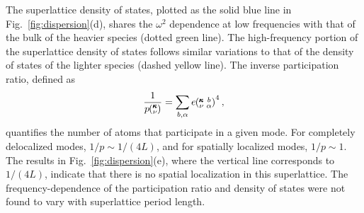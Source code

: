 \documentclass[aps,prb,preprint,preprintnumbers,amsmath,amssymb,floatfix,superscriptaddress]{revtex4}
\newcommand{\kvba}{\mspace{-4.0mu}\left(\mspace{-8.0mu}
\begin{smallmatrix} &\pmb{\kappa} &b \\ &\nu &\alpha\end{smallmatrix}
\mspace{-3.0mu}\right)}
\newcommand{\kv}{\mspace{-4.0mu}\left(\mspace{-8.0mu}
\begin{smallmatrix}&\pmb{\kappa} \\&\nu\end{smallmatrix}
\mspace{-3.0mu}\right)}
\begin{document}
The superlattice density of states, plotted as the solid blue line in Fig.~\ref{fig:dispersion}(d), shares the $\omega^2$ dependence at low frequencies with that of the bulk of the heavier species (dotted green line). The high-frequency portion of the superlattice density of states follows similar variations to that of the density of states of the lighter species (dashed yellow line). The inverse participation ratio, defined as\cite{PhysRevB.70.235214}
\begin{equation}\label{EQ:P_ratio}
\begin{split}
\frac{1}{p\kv}=\sum_{b,\alpha}e\kvba^4,
\end{split}
\end{equation}
quantifies the number of atoms that participate in a given mode. For completely delocalized modes, $1/p\sim 1/(4L)$, and for spatially localized modes, $1/p\sim 1$. The results in Fig.~\ref{fig:dispersion}(e), where the vertical line corresponds to $1/(4L)$, indicate that there is no spatial localization in this superlattice. The frequency-dependence of the participation ratio and density of states were not found to vary with superlattice period length.
\renewcommand{\topfraction}{0.7}
\begin{figure*}%
\begin{center}
\renewcommand{\figure}{Fig.}
\caption{(a),(b),(c) Dispersion, (d) density of states and (e) inverse participation ratio for a $4\times4$ superlattice. Labeled gray squares represent select modes for Fig.~\ref{fig:sed}.}%
\label{fig:dispersion}
\end{center}
\end{figure*}
\end{document}
